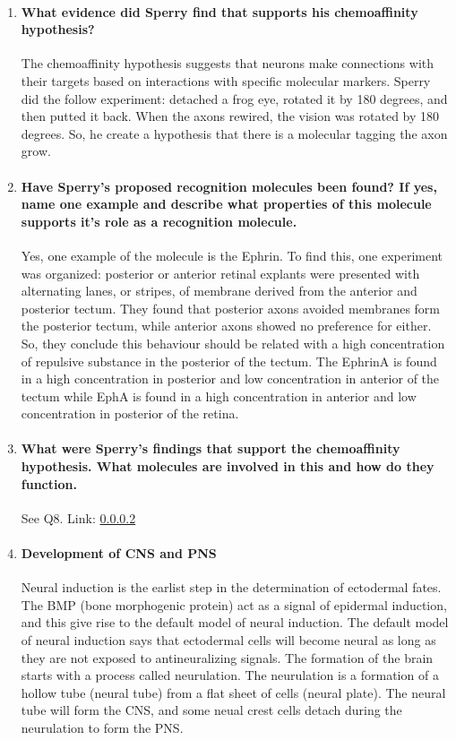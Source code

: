 \documentclass[12pt,article,oneside,a4paper]{memoir}
\begin{document}
\begin{enumerate}
\item \paragraph{What evidence did Sperry find that supports his chemoaffinity hypothesis?}

The chemoaffinity hypothesis suggests that neurons make connections with their targets based on interactions with specific molecular markers. Sperry did the follow experiment: detached a frog eye, rotated it by 180 degrees, and then putted it back. When the axons rewired, the vision was rotated by 180 degrees. So, he create a hypothesis that there is a molecular tagging the axon grow.

\item \paragraph{Have Sperry’s proposed recognition molecules been found? If yes, name one example and describe what properties of this molecule supports it’s role as a recognition molecule.}\label{question:chemoaffinity}

Yes, one example of the molecule is the Ephrin. To find this, one experiment was organized: posterior or anterior retinal explants were presented with alternating lanes, or stripes, of membrane derived from the anterior and posterior tectum. They found that posterior axons avoided membranes form the posterior tectum, while anterior axons showed no preference for either. So, they conclude this behaviour should be related with a high concentration of repulsive substance in the posterior of the tectum.
The EphrinA is found in a high concentration in posterior and low concentration in anterior of the tectum while EphA is found in a high concentration in anterior and low concentration in posterior of the retina.

\item \paragraph{What were Sperry's findings that support the chemoaffinity hypothesis. What molecules are involved in this and how do they function.}
See Q8. Link: \ref{question:chemoaffinity}

\item \paragraph{Development of CNS and PNS}
Neural induction is the earlist step in the determination of ectodermal fates. The BMP (bone morphogenic protein) act as a signal of epidermal induction, and this give rise to the default model of neural induction. The default model of neural induction says that ectodermal cells will become neural as long as they are not exposed to antineuralizing signals. The formation of the brain starts with a process called neurulation. The neurulation is a formation of a hollow tube (neural tube) from a flat sheet of cells (neural plate). The neural tube will form the CNS, and some neual crest cells detach during the neurulation to form the PNS.


\end{enumerate}
\end{document}
